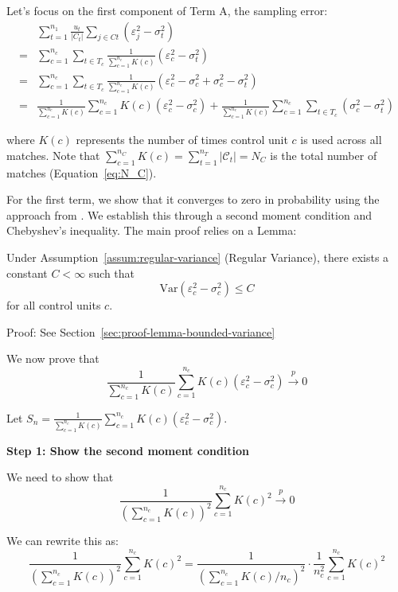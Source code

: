 \documentclass{mytemplate}
\begin{document}
Let's focus on the first component of Term A, the sampling error: 
\begin{align*}
& \sum_{t=1}^{n_1} \frac{u_t}{\left|C_t\right|} \sum_{j \in C t}\left(\varepsilon_j^2-\sigma_t^2\right) \\ 
= & \sum_{c=1}^{n_c} \sum_{t \in T_c} \frac{1}{\sum_{c=1}^{n_c} K(c) }\left(\varepsilon_c^2-\sigma_t^2\right) \\ 
= & \sum_{c=1}^{n_c} \sum_{t \in T_c} \frac{1}{\sum_{c=1}^{n_c}  K(c)}\left(\varepsilon_c^2-\sigma_c^2+\sigma_c^2-\sigma_t^2\right) \\ = & \frac{1}{\sum_{c=1}^{n_c} K(c)} \sum_{c=1}^{n_c} K(c)\left(\varepsilon_c^2-\sigma_c^2\right)+\frac{1}{\sum_{c=1}^{n_c} K(c)} \sum_{c=1}^{n_c} \sum_{t \in T_c}\left(\sigma_c^2-\sigma_t^2\right)
\end{align*}

where $K(c)$ represents the number of times control unit $c$ is used across all matches. Note that $ \sum_{c=1}^{n_C} K(c) = \sum_{t=1}^{n_T} |\mathcal{C}_t| = N_C$  is the total number of matches (Equation~\ref{eq:N_C}).

For the first term, we show that it converges to zero in probability using the approach from \cite{abadie2006large}. We establish this through a second moment condition and Chebyshev's inequality. The main proof relies on a Lemma:

\begin{lemma}
\label{lemma:bounded-variance}
Under Assumption~\ref{assum:regular-variance} (Regular Variance), there exists a constant $C < \infty$ such that
$$\text{Var}(\varepsilon_c^2 - \sigma_c^2) \leq C$$
for all control units $c$.
\end{lemma}

Proof: See Section~\ref{sec:proof-lemma-bounded-variance}


We now prove that 
$$\frac{1}{\sum_{c=1}^{n_c} K(c)} \sum_{c=1}^{n_c} K(c)(\varepsilon_c^2-\sigma_c^2) \xrightarrow{p} 0$$

Let $S_n = \frac{1}{\sum_{c=1}^{n_c} K(c)} \sum_{c=1}^{n_c} K(c)(\varepsilon_c^2-\sigma_c^2)$.

\textbf{Step 1: Show the second moment condition}

We need to show that 
$$\frac{1}{(\sum_{c=1}^{n_c} K(c))^2} \sum_{c=1}^{n_c} K(c)^2 \xrightarrow{p} 0$$

We can rewrite this as:
$$\frac{1}{(\sum_{c=1}^{n_c} K(c))^2} \sum_{c=1}^{n_c} K(c)^2 = \frac{1}{(\sum_{c=1}^{n_c} K(c)/n_c)^2} \cdot \frac{1}{n_c^2} \sum_{c=1}^{n_c} K(c)^2$$
\end{document}
